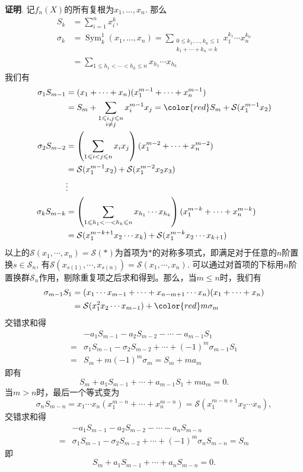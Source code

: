 {\bf 证明}. 记$f_n(X)$的所有复根为$x_1,\ldots,x_n$. 那么
\begin{align*}
S_k & = \sum\limits_{i=1}^n x_i^k, \\
\sigma_k & = \operatorname{Sym}_k^1(x_1,\ldots,x_n) = \sum\limits_{\substack{0 \leqslant k_1,\ldots,k_n \leqslant 1 \\ k_1+\cdots+k_n=k}} x_1^{k_1} \cdots x_n^{k_n} \\
& = \sum\limits_{1 \leqslant h_1 < \cdots < h_k \leqslant n} x_{h_1} \cdots x_{h_k}
\end{align*}
我们有
\begin{align*}
\sigma_1 S_{m-1} & = (x_1 + \cdots + x_n) (x_1^{m-1} + \cdots + x_n^{m-1}) \\
& = S_m + \sum_{\substack{1 \leqslant i,j \leqslant n \\ i\neq j}} x_i^{m-1} x_j = {\color{red} S_m} + \mathcal{S}(x_1^{m-1}x_2) \\
\sigma_2 S_{m-2} & = \left( \sum_{1 \leqslant i < j \leqslant n } x_i x_j \right) (x_1^{m-2} + \cdots + x_n^{m-2}) \\
& = \mathcal{S}(x_1^{m-1}x_2) + \mathcal{S}(x_1^{m-2}x_2x_3) \\
& \vdots \\
\sigma_k S_{m-k} & = \left( \sum\limits_{1 \leqslant h_1 < \cdots < h_k \leqslant n} x_{h_1} \cdots x_{h_k} \right) (x_1^{m-k} + \cdots + x_n^{m-k}) \\
& = \mathcal{S}(x_1^{m-k+1}x_2\cdots x_k) + \mathcal{S}(x_1^{m-k}x_2\cdots x_{k+1})
\end{align*}
以上的$\mathcal{S}(x_1,\cdots,x_n) = \mathcal{S}(\ast)$为首项为$\ast$的对称多项式，即满足对于任意的$n$阶置换$s\in \mathcal{S}_n$, 有$\mathcal{S}(x_{s(1)},\cdots,x_{s(n)}) = \mathcal{S}(x_1,\cdots,x_n)$. 可以通过对首项的下标用$n$阶置换群$\mathcal{S}_n$作用，剔除重复项之后求和得到。那么，当$m\leqslant n$时，我们有
\begin{align*}
\sigma_{m-1} S_1 & = (x_1\cdots x_{m-1} + \cdots + x_{n-m+1}\cdots x_{n}) (x_1 + \cdots + x_{n}) \\
& = \mathcal{S}(x_1^2x_2\cdots x_{m-1}) + {\color{red} m\sigma_m}
\end{align*}
交错求和得
\begin{align*}
& -a_1 S_{m-1} - a_2 S_{m-2} - \cdots - a_{m-1} S_1 \\
= & \sigma_1 S_{m-1} - \sigma_2 S_{m-2} + \cdots + (-1)^{m} \sigma_{m-1} S_{1} \\
= & S_m + m(-1)^{m}\sigma_m = S_m + ma_m
\end{align*}
即有
$$S_m + a_1S_{m-1} + \cdots + a_{m-1}S_1 + ma_m = 0.$$
当$m > n$时，最后一个等式变为
$$\sigma_n S_{m-n} = x_1\cdots x_n (x_1^{m-n} + \cdots + x_n^{m-n}) = \mathcal{S}(x_1^{m-n+1}x_2 \cdots x_n),$$
交错求和得
\begin{align*}
& -a_1 S_{m-1} - a_2 S_{m-2} - \cdots - a_n S_{m-n} \\
= & \sigma_1 S_{m-1} - \sigma_2 S_{m-2} + \cdots + (-1)^{m} \sigma_n S_{m-n} = S_m
\end{align*}
即
$$S_m + a_1 S_{m-1} + \cdots + a_n S_{m-n} = 0.$$

